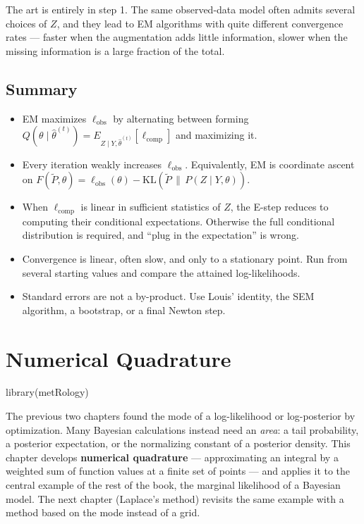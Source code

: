 \documentclass[
  letterpaper,
  DIV=11,
  numbers=noendperiod]{scrreprt}
\newenvironment{Shaded}{\begin{snugshade}}{\end{snugshade}}
\newcommand{\FunctionTok}[1]{\textcolor[rgb]{0.28,0.35,0.67}{#1}}
\newcommand{\NormalTok}[1]{\textcolor[rgb]{0.00,0.23,0.31}{#1}}
\providecommand{\tightlist}{%
  \setlength{\itemsep}{0pt}\setlength{\parskip}{0pt}}
\begin{document}
The art is entirely in step 1. The same observed-data model often admits
several choices of \(Z\), and they lead to EM algorithms with quite
different convergence rates --- faster when the augmentation adds little
information, slower when the missing information is a large fraction of
the total.

\section{Summary}\label{summary-1}

\begin{itemize}
\tightlist
\item
  EM maximizes \(\ell_{\text{obs}}\) by alternating between forming
  \(Q(\theta \mid \hat\theta^{(t)}) = E_{Z \mid Y, \hat\theta^{(t)}}[\ell_{\text{comp}}]\)
  and maximizing it.
\item
  Every iteration weakly increases \(\ell_{\text{obs}}\). Equivalently,
  EM is coordinate ascent on
  \(F(\tilde P, \theta) = \ell_{\text{obs}}(\theta) - \mathrm{KL}(\tilde P \,\|\, P(Z \mid Y, \theta))\).
\item
  When \(\ell_{\text{comp}}\) is linear in sufficient statistics of
  \(Z\), the E-step reduces to computing their conditional expectations.
  Otherwise the full conditional distribution is required, and ``plug in
  the expectation'' is wrong.
\item
  Convergence is linear, often slow, and only to a stationary point. Run
  from several starting values and compare the attained log-likelihoods.
\item
  Standard errors are not a by-product. Use Louis' identity, the SEM
  algorithm, a bootstrap, or a final Newton step.
\end{itemize}


\chapter{Numerical Quadrature}\label{numerical-quadrature}

\begin{Shaded}
\begin{Highlighting}[]
\FunctionTok{library}\NormalTok{(metRology)}
\end{Highlighting}
\end{Shaded}

The previous two chapters found the mode of a log-likelihood or
log-posterior by optimization. Many Bayesian calculations instead need
an \emph{area}: a tail probability, a posterior expectation, or the
normalizing constant of a posterior density. This chapter develops
\textbf{numerical quadrature} --- approximating an integral by a
weighted sum of function values at a finite set of points --- and
applies it to the central example of the rest of the book, the marginal
likelihood of a Bayesian model. The next chapter (Laplace's method)
revisits the same example with a method based on the mode instead of a
grid.
\end{document}
